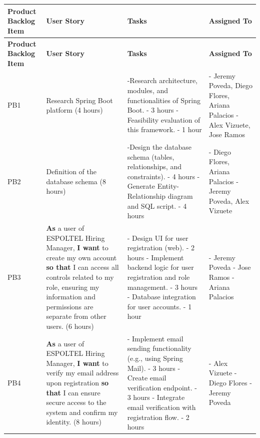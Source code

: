 \documentclass{scrreprt}
\begin{document}
\begin{longtable}{|p{1.5cm}|p{5.5cm}|p{4.5cm}|p{3cm}|} \hline
	\textbf{Product Backlog Item} & \textbf{User Story} & \textbf{Tasks} & \textbf{Assigned To} \\ \hline
	\endfirsthead
	\hline
	\textbf{Product Backlog Item} & \textbf{User Story} & \textbf{Tasks} & \textbf{Assigned To} \\ \hline
	\endhead
	
	PB1 & Research Spring Boot platform (4 hours) & 

	-Research architecture, modules, and functionalities of Spring Boot. - 3 hours\newline
	-Feasibility evaluation of this framework. - 1 hour 
	&
	- Jeremy Poveda, Diego Flores, Ariana Palacios\newline
	- Alex Vizuete, Jose Ramos
	\\ \hline
	
	PB2 & Definition of the database schema (8 hours) & 
	-Design the database schema (tables, relationships, and constraints). - 4 hours\newline
	-Generate Entity-Relationship diagram and SQL script. - 4 hours
	&
	- Diego Flores, Ariana Palacios\newline
	- Jeremy Poveda, Alex Vizuete
	\\ \hline
	PB3 & \textbf{As} a user of ESPOLTEL Hiring Manager, \textbf{I want} to create my own account \textbf{so that} I can access all controls related to my role, ensuring my information and permissions are separate from other users. (6 hours) & 
	- Design UI for user registration (web). - 2 hours \newline
	- Implement backend logic for user registration and role management. - 3 hours \newline
	- Database integration for user accounts. - 1 hour 
	&
	- Jeremy Poveda \newline
	- Jose Ramos \newline
	- Ariana Palacios
	\\ \hline
	
	PB4 & \textbf{As} a user of ESPOLTEL Hiring Manager, \textbf{I want} to verify my email address upon registration \textbf{so that} I can ensure secure access to the system and confirm my identity. (8 hours) & 
	- Implement email sending functionality (e.g., using Spring Mail). - 3 hours \newline
	- Create email verification endpoint. - 3 hours \newline
	- Integrate email verification with registration flow. - 2 hours
	&
	- Alex Vizuete \newline
	- Diego Flores \newline
	- Jeremy Poveda
	\\ \hline
	

\end{longtable}
\end{document}
